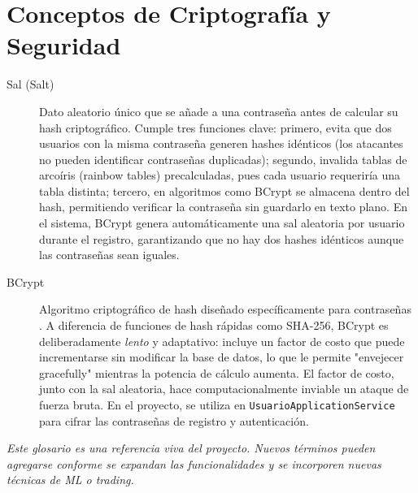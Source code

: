 \section*{Conceptos de Criptografía y Seguridad}

\begin{description}
    \item[Sal (Salt)] Dato aleatorio único que se añade a una contraseña antes de calcular su hash criptográfico. Cumple tres funciones clave: primero, evita que dos usuarios con la misma contraseña generen hashes idénticos (los atacantes no pueden identificar contraseñas duplicadas); segundo, invalida tablas de arcoíris (rainbow tables) precalculadas, pues cada usuario requeriría una tabla distinta; tercero, en algoritmos como BCrypt se almacena dentro del hash, permitiendo verificar la contraseña sin guardarlo en texto plano. En el sistema, BCrypt genera automáticamente una sal aleatoria por usuario durante el registro, garantizando que no hay dos hashes idénticos aunque las contraseñas sean iguales.

    \item[BCrypt] Algoritmo criptográfico de hash diseñado específicamente para contraseñas \parencite{provos_bcrypt_1999}. A diferencia de funciones de hash rápidas como SHA-256, BCrypt es deliberadamente \textit{lento} y adaptativo: incluye un factor de costo que puede incrementarse sin modificar la base de datos, lo que le permite "envejecer gracefully" mientras la potencia de cálculo aumenta. El factor de costo, junto con la sal aleatoria, hace computacionalmente inviable un ataque de fuerza bruta. En el proyecto, se utiliza en \texttt{UsuarioApplicationService} para cifrar las contraseñas de registro y autenticación.

\end{description}


\vspace{1cm}

\textit{Este glosario es una referencia viva del proyecto. Nuevos términos pueden agregarse conforme se expandan las funcionalidades y se incorporen nuevas técnicas de ML o trading.}